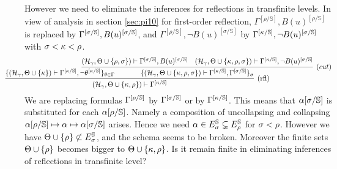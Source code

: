 \documentclass{article}
\newcommand{\mS}{\mathbb{S}}
\begin{document}
However we need to eliminate the inferences for reflections in transfinite levels.
In view of analysis in section \ref{sec:pi10} for first-order reflection,
$\Gamma^{[\rho/\mS]}, B(u)^{[\rho/\mS]}$ is replaced by $\Gamma^{[\sig/\mS]}, B(u)^{[\sig/\mS]}$,
and
$\Gamma^{[\rho/\mS]}, \lnot B(u)^{[\sigma/\mathbb{S}]}$ by $\Gamma^{[\kap/\mS]}, \lnot B(u)^{[\sigma/\mathbb{S}]}$ with $\sigma<\kappa<\rho$.
{\small
\[
\hspace{-10mm}
\infer[({\rm rfl})]{(\mathcal{H}_{\gamma},\Theta\cup\{\kap,\rho\})\vdash\Gam^{[\kap/\mS]}
}
{
\{
(\mathcal{H}_{\gamma},\Theta\cup\{\kap\})\vdash\Gam^{[\kap/\mS]},\lnot\tht^{[\kap/\mS]}
\}_{\tht\in\Gam}
&
\hspace{-20mm}
\infer[(cut)]{
\{(\mathcal{H}_{\gamma},\Theta\cup\{\kap,\rho,\sig\}
)
\vdash
\Gamma^{[\kap/\mS]},\Gamma^{[\sig/\mS]}
\}_{\sig}
}
{
(\mathcal{H}_{\gamma},\Theta\cup\{\rho,\sig\}
)\vdash
\Gamma^{[\sig/\mS]}, B(u)^{[\sig/\mS]}
&
(\mathcal{H}_{\gamma},\Theta\cup\{\kap,\rho,\sigma\}
)
\vdash
\Gamma^{[\kap/\mS]}, \lnot B(u)^{[\sigma/\mathbb{S}]}
}
}
\]
}
We are replacing formulas $\Gam^{[\rho/\mS]}$ by $\Gam^{[\sig/\mS]}$ or by
$\Gam^{[\kap/\mS]}$.
This means that $\alp[\sig/\mS]$ is substituted for each $\alp[\rho/\mS]$.
Namely a composition of uncollapsing and collapsing $\alp[\rho/\mS]\mapsto\alp\mapsto\alp[\sig/\mS]$
arises.
Hence we need $\alp\in E^{\mS}_{\sig}\subsetneq E^{\mS}_{\rho}$ for $\sigma<\rho$.
However we have $\Tht\cup\{\rho\}\not\subset E^{\mS}_{\sig}$, and the schema seems to be broken.
Moreover the finite sets $\Theta\cup\{\rho\}$ becomes bigger to $\Theta\cup\{\kappa,\rho\}$.
Is it remain finite in eliminating inferences of reflections in transfinite level?
\end{document}
